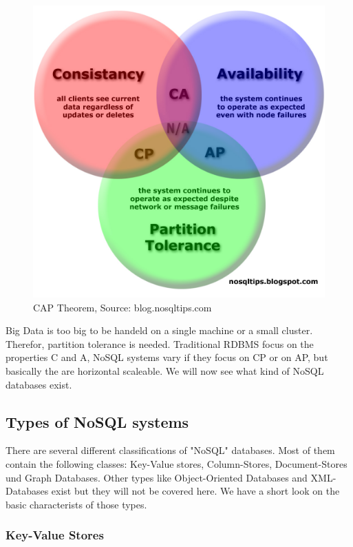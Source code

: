 \documentclass{acm_proc_article-sp}
\begin{document}
\begin{figure}[hbtp]
	\centering
	\includegraphics[scale=0.2]{CAP_Diagram_dist-copy.jpg}
	\caption{CAP Theorem, Source: blog.nosqltips.com}
\end{figure}

Big Data is too big to be handeld on a single machine or a small cluster. Therefor, partition tolerance is needed. Traditional RDBMS focus on the properties C and A, NoSQL systems vary if they focus on CP or on AP, but basically the are horizontal scaleable. We will now see what kind of NoSQL databases exist.

\subsection{Types of NoSQL systems}

There are several different classifications of "NoSQL" databases. Most of them contain the following classes: Key-Value stores, Column-Stores, Document-Stores und Graph Databases. Other types like Object-Oriented Databases and XML-Databases exist but they will not be covered here. We have a short look on the basic characterists of those types.

\subsubsection{Key-Value Stores}
\end{document}
